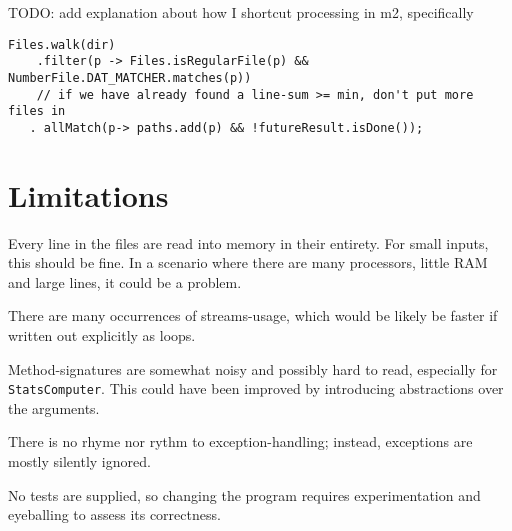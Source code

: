 \documentclass[a4paper,11pt]{article}
\begin{document}
TODO: add explanation about how I shortcut processing in m2,
specifically

\begin{verbatim}
Files.walk(dir)
    .filter(p -> Files.isRegularFile(p) && NumberFile.DAT_MATCHER.matches(p))
    // if we have already found a line-sum >= min, don't put more files in
   . allMatch(p-> paths.add(p) && !futureResult.isDone());
\end{verbatim}

\section{Limitations}

Every line in the files are read into memory in their entirety.  For
small inputs, this should be fine.  In a scenario where there are many
processors, little RAM and large lines, it could be a problem.

There are many occurrences of streams-usage, which would be likely be
faster if written out explicitly as loops.

Method-signatures are somewhat noisy and possibly hard to read,
especially for \texttt{StatsComputer}.  This could have been improved
by introducing abstractions over the arguments.

There is no rhyme nor rythm to exception-handling; instead, exceptions
are mostly silently ignored.

No tests are supplied, so changing the program requires
experimentation and eyeballing to assess its correctness.
\end{document}
